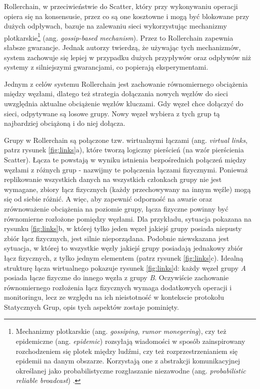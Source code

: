 \documentclass[12pt, twoside, openany]{report}
\begin{document}
Rollerchain, w przeciwieństwie do Scatter, który przy wykonywaniu operacji opiera się na konsensusie, przez co są one kosztowne i mogą być blokowane przy dużych odpływach, bazuje na zalewaniu sieci wykorzystując mechanizmy plotkarskie\footnote{Mechanizmy plotkarskie (ang. \textit{gossiping}, \textit{rumor monegering}), czy też epidemiczne (ang. \textit{epidemic}) rozsyłają wiadomości w sposób zainspirowany rozchodzeniem się plotek między ludźmi, czy też rozprzestrzenianiem się epidemii na danym obszarze. Korzystają one z abstrakcji komunikacyjnej określanej jako probabilistyczne rozgłaszanie niezawodne (ang. \textit{probabilistic reliable broadcast}) \cite{bib:pr}.} (ang. \textit{gossip-based mechanism}). Przez to Rollerchain zapewnia słabsze gwarancje. Jednak autorzy twierdzą, że używając tych mechanizmów, system zachowuje się lepiej w przypadku dużych przypływów oraz odpływów niż systemy z silniejszymi gwarancjami, co popierają eksperymentami.

Jednym z celów systemu Rollerchain jest zachowanie równomiernego obciążenia między węzłami, dlatego też strategia dołączania nowych węzłów do sieci uwzględnia aktualne obciążenie węzłów kluczami. Gdy węzeł chce dołączyć do sieci, odpytywane są losowe grupy. Nowy węzeł wybiera z tych grup tą najbardziej obciążoną i do niej dołącza.

Grupy w Rollerchain są połączone tzw. wirtualnymi łączami (ang. \textit{virtual links}, patrz rysunek \ref{fig:links}a), które tworzą logiczny pierścień (na wzór pierścienia Scatter). Łącza te powstają w wyniku istnienia bezpośrednich połączeń między węzłami z różnych grup - nazwijmy te połączenia łączami fizycznymi. Ponieważ replikowanie wszystkich danych na wszystkich członkach grupy nie jest wymagane, zbiory łącz fizycznych (każdy przechowywany na innym węźle) mogą się od siebie różnić. A więc, aby zapewnić odporność na awarie oraz zrównoważenie obciążenia na poziomie grupy, łącza fizyczne powinny być równomierne rozłożone pomiędzy węzłami. Dla przykładu, sytuacja pokazana na rysunku \ref{fig:links}b, w której tylko jeden węzeł jakiejś grupy posiada niepusty zbiór łącz fizycznych, jest silnie nieporządana. Podobnie niewskazana jest sytuacja, w której to wszystkie węzły jakiejś grupy posiadają jednakowy zbiór łącz fizycznych, z tylko jednym elementem (patrz rysunek \ref{fig:links}c). Idealną strukturę łącza wirtualnego pokazuje rysunek \ref{fig:links}d: każdy węzeł grupy \textit{A} posiada łącze fizyczne do innego węzła z grupy \textit{B}. Oczywiście zachowanie równomiernego rozłożenia łącz fizycznych wymaga dodatkowych operacji i monitoringu, lecz ze względu na ich nieistotność w kontekscie protokołu Statycznych Grup, opis tych aspektów zostaje pominięty.
\end{document}
